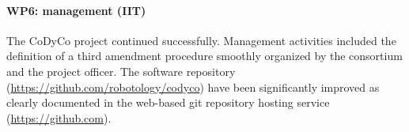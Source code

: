 

\paragraph*{WP6: management (IIT)}

The CoDyCo project continued successfully. Management activities included the definition of a third amendment procedure smoothly organized by the consortium and the project officer. The software repository (\url{https://github.com/robotology/codyco}) have been significantly improved as clearly documented in the web-based git repository hosting service (\url{https://github.com}). 
